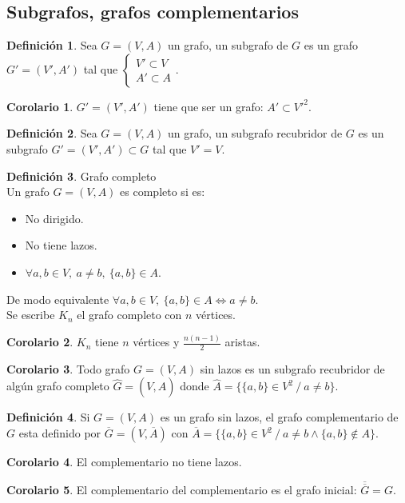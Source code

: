 \documentclass[10pt]{article}
\theoremstyle{definition}
\newtheorem{definition}{Definición}[section]
\newtheorem{corollary}{Corolario}[theorem]
\begin{document}
\subsection{Subgrafos, grafos complementarios}
\begin{definition}
	Sea $G=(V,A)$ un grafo, un subgrafo de $G$ es un grafo $G'=(V',A')$ tal que $\begin{cases}V'\subset V\\A'\subset A\end{cases}$.
\end{definition}
\begin{corollary}
	$G'=(V',A')$ tiene que ser un grafo: $A'\subset V'^2$.
\end{corollary}
\begin{definition}
	Sea $G=(V,A)$ un grafo, un subgrafo recubridor de $G$ es un subgrafo $G'=(V',A')\subset G$ tal que $V'=V$.
\end{definition}
\begin{definition}{Grafo completo}
	\\Un grafo $G=(V,A)$ es completo si es:
	\begin{itemize}
		\item No dirigido.
		\item No tiene lazos.
		\item $\forall a,b\in V,\ a\neq b,\ \{a,b\}\in A$.
	\end{itemize}
	De modo equivalente $\forall a,b\in V,\ \{a,b\}\in A\Leftrightarrow a\neq b$.\\
	Se escribe $K_n$ el grafo completo con $n$ vértices.
\end{definition}
\begin{corollary}
	$K_n$ tiene $n$ vértices y $\frac{n(n-1)}{2}$ aristas.
\end{corollary}
\begin{corollary}
	Todo grafo $G=(V,A)$ sin lazos es un subgrafo recubridor de algún grafo completo $\hat{G}=(V,\hat{A})$ donde $\hat{A}=\{\{a,b\}\in V^2\ /\ a\neq b\}$.
\end{corollary}
\begin{definition}
	Si $G=(V,A)$ es un grafo sin lazos, el grafo complementario de $G$ esta definido por $\overline{G}=(V,\overline{A})$ con $\overline{A}=\{\{a,b\}\in V^2\ /\ a\neq b\wedge \{a,b\}\notin A\}$.
\end{definition}
\begin{corollary}
	El complementario no tiene lazos.
\end{corollary}
\begin{corollary}
	El complementario del complementario es el grafo inicial: $\overline{\overline{G}}=G$.
\end{corollary}
\end{document}

